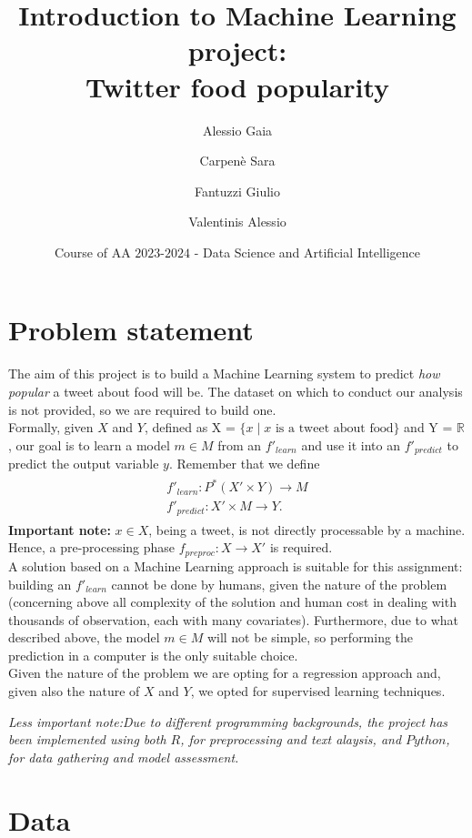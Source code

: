\documentclass{article}
\title{Introduction to Machine Learning project:\\Twitter food popularity}
\author[1]{Alessio Gaia}
\author[2]{Carpenè Sara}
\author[3]{Fantuzzi Giulio}
\author[4]{Valentinis Alessio}
\affil[1,2,3,4]{
    problem statement,
    solution design,
    solution development,
    data gathering,
    writing
}
\date{Course of AA $2023$-$2024$ - Data Science and Artificial Intelligence}
\begin{document}
\maketitle



\section{Problem statement}
\label{sec:problem_statement}
The aim of this project is to build a Machine Learning system to predict \textit{how popular} a tweet about food will be.
The dataset on which to conduct our analysis is not provided, so we are required to build one.\\
Formally, given $X$ and $Y$, defined as X = $\{x \mid x \text{ is a tweet about food}\}$ and Y = $\mathbb{R}$, our goal is to learn a model $m \in M$ from an $f'_{learn}$ and use it into an $f'_{predict}$ to predict the output variable $y$.
Remember that we define
\begin{align*}
\begin{gathered}
	f'_{learn}: P^{*}(X' \times Y) \rightarrow M\\
	f'_{predict} : X' \times M \rightarrow Y.
\end{gathered}
\end{align*}
\textbf{Important note:} $x \in X$, being a tweet, is not directly processable by a machine. Hence, a pre-processing phase $f_{preproc}: X \rightarrow X'$ is required.\\[0.2cm]
A solution based on a Machine Learning approach is suitable for this assignment: building an $f'_{learn}$ cannot be done by humans, given the nature of the problem (concerning above all complexity of the solution and human cost in dealing with thousands of observation, each with many covariates).
Furthermore, due to what described above, the model $m \in M$ will not be simple, so performing the prediction in a computer is the only suitable choice.\\
Given the nature of the problem we are opting for a regression approach and, given also the nature of $X$ and $Y$, we opted for supervised learning techniques.

\textit{Less important note:Due to different programming backgrounds, the project has been implemented using both $R$, for preprocessing and text alaysis, and $Python$, for data gathering and model assessment.}



\section{Data}
\label{sec:data}
\end{document}
